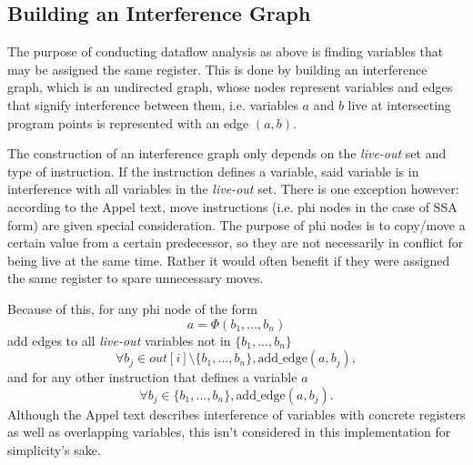 \documentclass{article}
\begin{document}
\subsection{Building an Interference Graph}

The purpose of conducting dataflow analysis as above is finding variables that may be assigned the same register. This is done by building an interference graph, which is an undirected graph, whose nodes represent variables and edges that signify interference between them, i.e. variables \(a\) and \(b\) live at intersecting program points is represented with an edge \((a,b)\).


The construction of an interference graph only depends on the \textit{live-out} set and type of instruction. If the instruction defines a variable, said variable is in interference with all variables in the \textit{live-out} set. There is one exception however: according to the Appel text, move instructions (i.e. phi nodes in the case of SSA form) are given special consideration. The purpose of phi nodes is to copy/move a certain value from a certain predecessor, so they are not necessarily in conflict for being live at the same time. Rather it would often benefit if they were assigned the same register to spare unnecessary moves. %


Because of this, for any phi node of the form 
\begin{equation}
 a = \Phi (b_1, ..., b_n) \label{phi}
\end{equation}
add edges to all \textit{live-out} variables not in \(\{b_1, ..., b_n\}\)
\[
  \forall b_j \in \mathit{out}[i] \setminus \{b_1, ..., b_n\}, \text{add\_edge}(a, b_j),
\]
and for any other instruction that defines a variable \(a\)
\[
  \forall b_j \in \{b_1, ..., b_n\}, \text{add\_edge}(a, b_j).
\]
Although the Appel text \cite{tiger} describes interference of variables with concrete registers as well as overlapping variables, this isn't considered in this implementation %
for simplicity's sake.
\end{document}
